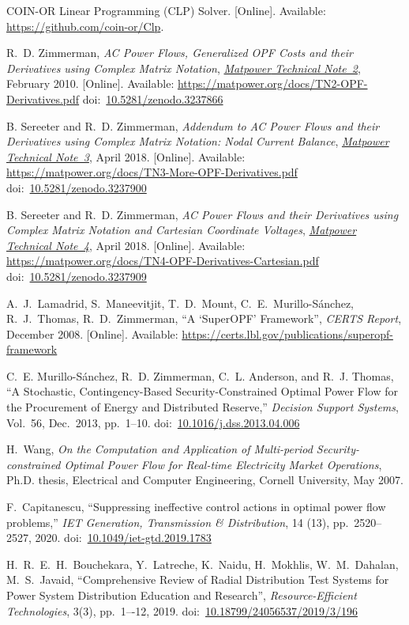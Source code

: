 \documentclass[12pt]{article}
\newcommand{\matpower}[0]{{\sc Matpower}}
\newcommand{\TNtwourl}[0]{https://matpower.org/docs/TN2-OPF-Derivatives.pdf}
\newcommand{\TNtwo}[0]{\href{\TNtwourl}{\it \matpower{} Technical Note~2}}
\newcommand{\TNthreeurl}[0]{https://matpower.org/docs/TN3-More-OPF-Derivatives.pdf}
\newcommand{\TNthree}[0]{\href{\TNthreeurl}{\it \matpower{} Technical Note~3}}
\newcommand{\TNfoururl}[0]{https://matpower.org/docs/TN4-OPF-Derivatives-Cartesian.pdf}
\newcommand{\TNfour}[0]{\href{\TNfoururl}{\it \matpower{} Technical Note~4}}
\newcommand{\doi}[1]{doi:~\href{https://doi.org/#1}{#1}}
\numberwithin{equation}{section}
\numberwithin{table}{section}
\numberwithin{figure}{section}
\begin{document}
\begin{thebibliography}{99}
COIN-OR Linear Programming (CLP) Solver. [Online]. Available:
  \url{https://github.com/coin-or/Clp}.

R.~D. Zimmerman, \emph{AC Power Flows, Generalized OPF Costs and their Derivatives using Complex Matrix Notation}, \TNtwo, February 2010. [Online]. Available: \url{\TNtwourl}
\doi{10.5281/zenodo.3237866}

B. Sereeter and R.~D. Zimmerman, \emph{Addendum to AC Power Flows and their Derivatives using Complex Matrix Notation: Nodal Current Balance}, \TNthree, April 2018. [Online]. Available: \url{\TNthreeurl}
\doi{10.5281/zenodo.3237900}

B. Sereeter and R.~D. Zimmerman, \emph{AC Power Flows and their Derivatives using Complex Matrix Notation and Cartesian Coordinate Voltages}, \TNfour, April 2018. [Online]. Available: \url{\TNfoururl}
\doi{10.5281/zenodo.3237909}

A.~J.~Lamadrid, S.~Maneevitjit, T.~D.~Mount, C.~E.~Murillo-S{\'a}nchez, R.~J.~Thomas, R.~D.~Zimmerman, ``A `SuperOPF' Framework'', \emph{CERTS Report}, December 2008. [Online]. Available: \url{https://certs.lbl.gov/publications/superopf-framework}

C.~E. Murillo-S{\'a}nchez, R.~D. Zimmerman, C.~L. Anderson, and R.~J. Thomas, ``A Stochastic, Contingency-Based Security-Constrained Optimal Power Flow for the Procurement of Energy and Distributed Reserve,'' \emph{Decision Support Systems}, Vol.~56, Dec.~2013, pp.~1--10.
\doi{10.1016/j.dss.2013.04.006}

H.~Wang, \emph{On the Computation and Application of Multi-period Security-constrained Optimal Power Flow for Real-time Electricity Market Operations}, Ph.D. thesis, Electrical and Computer Engineering, Cornell University, May 2007.

F.~Capitanescu, ``Suppressing ineffective control actions in optimal power flow problems,'' \emph{IET Generation, Transmission \& Distribution}, 14 (13), pp.~2520--2527, 2020.
\doi{10.1049/iet-gtd.2019.1783}

H.~R.~E.~H.~Bouchekara, Y.~Latreche, K.~Naidu, H.~Mokhlis, W.~M.~Dahalan, M.~S.~Javaid, ``Comprehensive Review of Radial Distribution Test Systems for Power System Distribution Education and Research'', \emph{Resource-Efficient Technologies}, 3(3), pp.~1–-12, 2019.
\doi{10.18799/24056537/2019/3/196}


\end{thebibliography}
\end{document}
